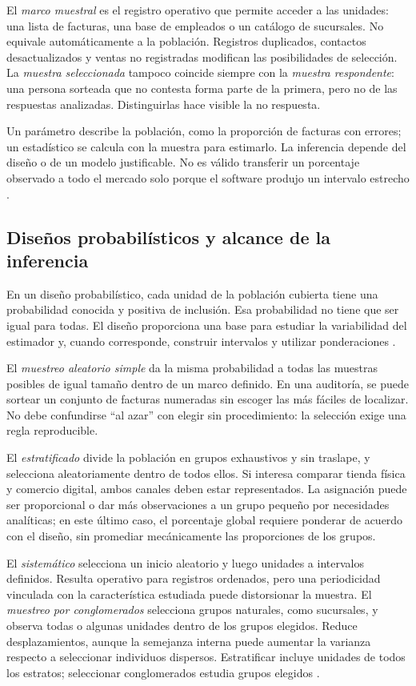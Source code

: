 {El \textit{marco muestral} es el registro operativo que permite acceder a las unidades: una lista de facturas, una base de empleados o un catálogo de sucursales. No equivale automáticamente a la población. Registros duplicados, contactos desactualizados y ventas no registradas modifican las posibilidades de selección. La \textit{muestra seleccionada} tampoco coincide siempre con la \textit{muestra respondente}: una persona sorteada que no contesta forma parte de la primera, pero no de las respuestas analizadas. Distinguirlas hace visible la no respuesta.

Un parámetro describe la población, como la proporción de facturas con errores; un estadístico se calcula con la muestra para estimarlo. La inferencia depende del diseño o de un modelo justificable. No es válido transferir un porcentaje observado a todo el mercado solo porque el software produjo un intervalo estrecho \citep{holmesBusiness2023,wackerly2010}.

\subsection{Diseños probabilísticos y alcance de la inferencia}
En un diseño probabilístico, cada unidad de la población cubierta tiene una probabilidad conocida y positiva de inclusión. Esa probabilidad no tiene que ser igual para todas. El diseño proporciona una base para estudiar la variabilidad del estimador y, cuando corresponde, construir intervalos y utilizar ponderaciones \citep{holmesBusiness2023}.

El \textit{muestreo aleatorio simple} da la misma probabilidad a todas las muestras posibles de igual tamaño dentro de un marco definido. En una auditoría, se puede sortear un conjunto de facturas numeradas sin escoger las más fáciles de localizar. No debe confundirse ``al azar'' con elegir sin procedimiento: la selección exige una regla reproducible.

El \textit{estratificado} divide la población en grupos exhaustivos y sin traslape, y selecciona aleatoriamente dentro de todos ellos. Si interesa comparar tienda física y comercio digital, ambos canales deben estar representados. La asignación puede ser proporcional o dar más observaciones a un grupo pequeño por necesidades analíticas; en este último caso, el porcentaje global requiere ponderar de acuerdo con el diseño, sin promediar mecánicamente las proporciones de los grupos.

El \textit{sistemático} selecciona un inicio aleatorio y luego unidades a intervalos definidos. Resulta operativo para registros ordenados, pero una periodicidad vinculada con la característica estudiada puede distorsionar la muestra. El \textit{muestreo por conglomerados} selecciona grupos naturales, como sucursales, y observa todas o algunas unidades dentro de los grupos elegidos. Reduce desplazamientos, aunque la semejanza interna puede aumentar la varianza respecto a seleccionar individuos dispersos. Estratificar incluye unidades de todos los estratos; seleccionar conglomerados estudia grupos elegidos \citep{holmesBusiness2023}.

}
